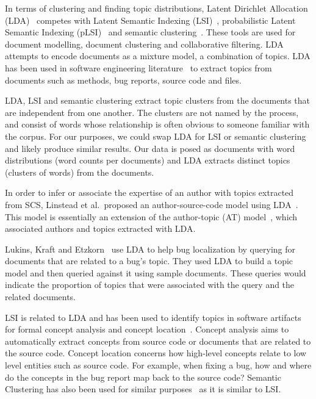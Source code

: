 \documentclass[times, 10pt,twocolumn]{article}
\newcommand{\shrinkit}{\vspace*{-.3em}}
\begin{document}

In terms of clustering and finding topic distributions, Latent
Dirichlet Allocation (LDA)~\cite{944937} competes with Latent Semantic
Indexing
(LSI)~\cite{1374321,10.1109/ICPC.2007.13},
probabilistic Latent Semantic Indexing (pLSI)~\cite{944937} and
semantic clustering~\cite{1698774,1566153}. These tools are used for
document modelling, document clustering and collaborative
filtering. LDA attempts to encode documents as a mixture
model, a combination of topics.  LDA has been used in software engineering
literature~\cite{lukins2008,10.1109/MSR.2007.20}%
to extract topics from documents such as methods, bug
reports, source code and files.

LDA, LSI and semantic clustering extract topic
clusters from the documents that are independent from one another. 
The clusters are not named by the process, and consist of
words whose
relationship is often obvious to someone familiar with the corpus. For our purposes, we
could swap LDA for LSI or semantic clustering and likely produce similar
results. Our data is posed as documents with word distributions (word
counts per documents) and LDA extracts distinct topics (clusters of
words) from the documents.

\shrinkit
{}
\shrinkit




In order to infer or associate the expertise of an author with topics
extracted from SCS, Linstead et al.\  proposed an author-source-code model
using LDA~\cite{10.1109/MSR.2007.20}.%
  This model
is essentially an extension of the author-topic (AT)
model~\cite{1036902}, which associated authors and topics extracted
with LDA.

Lukins, Kraft and Etzkorn~\cite{lukins2008} use LDA to help bug
localization by querying for documents that are related to a bug's topic. They
used LDA to build a topic model and then queried against it using
sample documents. These queries would indicate the proportion of
topics that were associated with the query and the
related documents.

LSI is related to LDA and has been used to identify topics in software
artifacts for formal concept analysis and concept
location~\cite{1374321,10.1109/ICPC.2007.13}.
Concept analysis aims to automatically extract concepts from source
code or documents that are related to the source code.  Concept location concerns how
high-level concepts relate to low level entities such as source code. For
example, when fixing a bug, how and where do the concepts in the bug
report map back to the source code?  Semantic Clustering has also been
used for similar purposes~\cite{1698774,1566153} as it is similar to
LSI.
\end{document}
